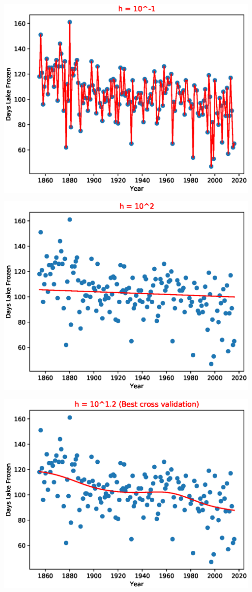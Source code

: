 \documentclass{article}
\begin{document}
\begin{enumerate}
\begin{enumerate}
\hspace*{-4cm}
\includegraphics[scale=1]{n1_KDE}

\hspace*{-4cm}
\includegraphics[scale=1]{2_KDE}

\hspace*{-4cm}
\includegraphics[scale=1]{1_2_KDE}


\end{enumerate}
\end{enumerate}
\end{document}
